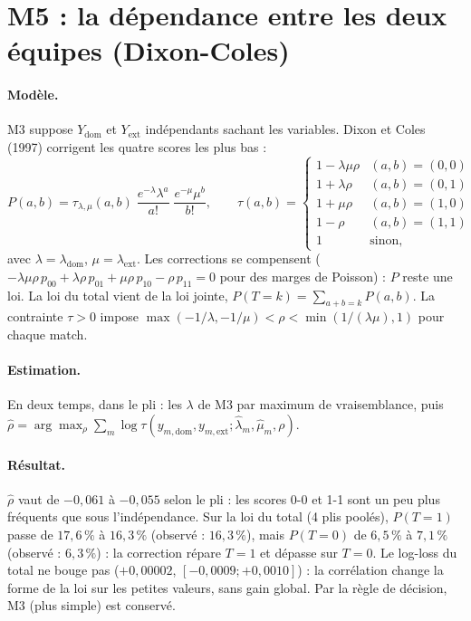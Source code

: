 \section{M5 : la dépendance entre les deux équipes (Dixon-Coles)}
\label{sec:m5}

\paragraph{Modèle.} M3 suppose \(Y_{\mathrm{dom}}\) et \(Y_{\mathrm{ext}}\) indépendants sachant
les variables. Dixon et Coles (1997) corrigent les quatre scores les plus bas :
\[
  P(a, b) = \tau_{\lambda,\mu}(a, b)\; \frac{e^{-\lambda}\lambda^{a}}{a!}\; \frac{e^{-\mu}\mu^{b}}{b!},
  \qquad
  \tau(a, b) =
  \begin{cases}
    1 - \lambda\mu\rho & (a, b) = (0, 0)\\
    1 + \lambda\rho & (a, b) = (0, 1)\\
    1 + \mu\rho & (a, b) = (1, 0)\\
    1 - \rho & (a, b) = (1, 1)\\
    1 & \text{sinon,}
  \end{cases}
\]
avec \(\lambda = \lambda_{\mathrm{dom}}\), \(\mu = \lambda_{\mathrm{ext}}\). Les corrections se
compensent (\(-\lambda\mu\rho\, p_{00} + \lambda\rho\, p_{01} + \mu\rho\, p_{10} - \rho\, p_{11} = 0\)
pour des marges de Poisson) : \(P\) reste une loi. La loi du total vient de la loi jointe,
\(P(T = k) = \sum_{a + b = k} P(a, b)\). La contrainte \(\tau > 0\) impose
\(\max(-1/\lambda, -1/\mu) < \rho < \min(1/(\lambda\mu), 1)\) pour chaque match.

\paragraph{Estimation.} En deux temps, dans le pli : les \(\lambda\) de M3 par maximum de
vraisemblance, puis \(\hat\rho = \arg\max_\rho \sum_m \log \tau(y_{m,\mathrm{dom}}, y_{m,\mathrm{ext}};
\hat\lambda_m, \hat\mu_m, \rho)\).

\paragraph{Résultat.} \(\hat\rho\) vaut de \(-0{,}061\) à \(-0{,}055\) selon le pli : les scores 0-0
et 1-1 sont un peu plus fréquents que sous l'indépendance. Sur la loi du total (4 plis poolés),
\(P(T = 1)\) passe de \(17{,}6\,\%\) à \(16{,}3\,\%\) (observé : \(16{,}3\,\%\)), mais \(P(T = 0)\) de
\(6{,}5\,\%\) à \(7{,}1\,\%\) (observé : \(6{,}3\,\%\)) : la correction répare \(T = 1\) et dépasse sur
\(T = 0\). Le log-loss du total ne bouge pas (\(+0{,}00002\), \([-0{,}0009 ; +0{,}0010]\)) : la
corrélation change la forme de la loi sur les petites valeurs, sans gain global. Par la règle de
décision, M3 (plus simple) est conservé.

